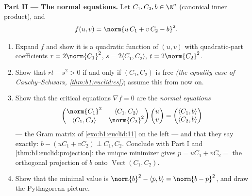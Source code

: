 \begin{problem}
\medskip
\noindent\textbf{Part II --- The normal equations.} Let $C_1,
C_2, b \in \R^n$ (canonical inner product), and
\[
f(u, v) = \norm{u\,C_1 + v\,C_2 - b}^2 .
\]
\begin{enumerate}[resume]
  \item Expand $f$ and show it is a quadratic function of $(u,
        v)$ with quadratic-part coefficients $r = 2\norm{C_1}^2$,
        $s = 2\langle C_1, C_2\rangle$, $t = 2\norm{C_2}^2$.
  \item Show that $rt - s^2 > 0$ if and only if $(C_1, C_2)$ is
        free \emph{(the equality case of Cauchy--Schwarz,
        \cref{thm:b1:euclid:cs})}; assume this from now on.
  \item Show that the critical equations $\nabla f = 0$ are the
        \emph{normal equations}
        \[
        \begin{pmatrix}
        \norm{C_1}^2 & \langle C_1, C_2\rangle\\
        \langle C_1, C_2\rangle & \norm{C_2}^2
        \end{pmatrix}
        \begin{pmatrix} u\\ v\end{pmatrix}
        =
        \begin{pmatrix} \langle C_1, b\rangle\\ \langle C_2,
        b\rangle\end{pmatrix}
        \]
        --- the Gram matrix of \cref{exo:b1:euclid:11} on the
        left --- and that they say exactly: $b - (uC_1 + vC_2)
        \perp C_1, C_2$. Conclude with Part I and
        \cref{thm:b1:euclid:projection}: the unique minimizer
        gives $p = uC_1 + vC_2 = $ the orthogonal projection of
        $b$ onto $\operatorname{Vect}(C_1, C_2)$.
  \item Show that the minimal value is $\norm{b}^2 - \langle p,
        b\rangle = \norm{b - p}^2$, and draw the Pythagorean
        picture.
\end{enumerate}


\end{problem}
